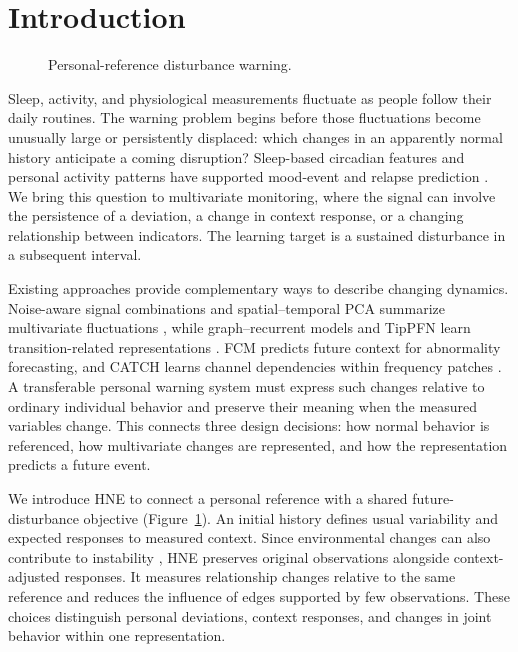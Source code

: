 \section{Introduction}
\label{sec:introduction}

\begin{figure}[t]
\centering
\emptyframe{\columnwidth}{8.0cm}
\caption{Personal-reference disturbance warning.}
\label{fig:concept}
\end{figure}

Sleep, activity, and physiological measurements fluctuate as people follow their daily routines. The warning problem begins before those fluctuations become unusually large or persistently displaced: which changes in an apparently normal history anticipate a coming disruption? Sleep-based circadian features and personal activity patterns have supported mood-event and relapse prediction \citep{hneA08,hneA10}. We bring this question to multivariate monitoring, where the signal can involve the persistence of a deviation, a change in context response, or a changing relationship between indicators. The learning target is a sustained disturbance in a subsequent interval.

Existing approaches provide complementary ways to describe changing dynamics. Noise-aware signal combinations and spatial--temporal PCA summarize multivariate fluctuations \citep{hneM01,hneM07}, while graph--recurrent models and TipPFN learn transition-related representations \citep{hneM08,hneM12}. FCM predicts future context for abnormality forecasting, and CATCH learns channel dependencies within frequency patches \citep{hneH01,hneC01}. A transferable personal warning system must express such changes relative to ordinary individual behavior and preserve their meaning when the measured variables change. This connects three design decisions: how normal behavior is referenced, how multivariate changes are represented, and how the representation predicts a future event.

We introduce HNE to connect a personal reference with a shared future-disturbance objective (Figure~\ref{fig:concept}). An initial history defines usual variability and expected responses to measured context. Since environmental changes can also contribute to instability \citep{hneM06}, HNE preserves original observations alongside context-adjusted responses. It measures relationship changes relative to the same reference and reduces the influence of edges supported by few observations. These choices distinguish personal deviations, context responses, and changes in joint behavior within one representation.

